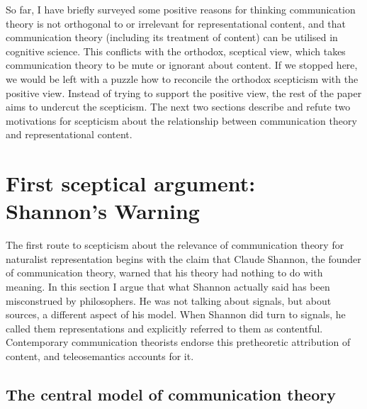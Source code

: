 \documentclass[12pt]{article}
\begin{document}
So far, I have briefly surveyed some positive reasons for thinking communication theory is not orthogonal to or irrelevant for representational content, and that communication theory (including its treatment of content) can be utilised in cognitive science.
This conflicts with the orthodox, sceptical view, which takes communication theory to be mute or ignorant about content.
If we stopped here, we would be left with a puzzle how to reconcile the orthodox scepticism with the positive view.
Instead of trying to support the positive view, the rest of the paper aims to undercut the scepticism.
The next two sections describe and refute two motivations for scepticism about the relationship between communication theory and representational content.



\section{First sceptical argument: Shannon's Warning}\label{sec:warning}

The first route to scepticism about the relevance of communication theory for naturalist representation begins with the claim that Claude Shannon, the founder of communication theory, warned that his theory had nothing to do with meaning.
In this section I argue that what Shannon actually said has been misconstrued by philosophers.
He was not talking about signals, but about sources, a different aspect of his model.
When Shannon did turn to signals, he called them representations and explicitly referred to them as contentful.
Contemporary communication theorists endorse this pretheoretic attribution of content, and teleosemantics accounts for it.

\subsection{The central model of communication theory}\label{subsec:central}
\end{document}
